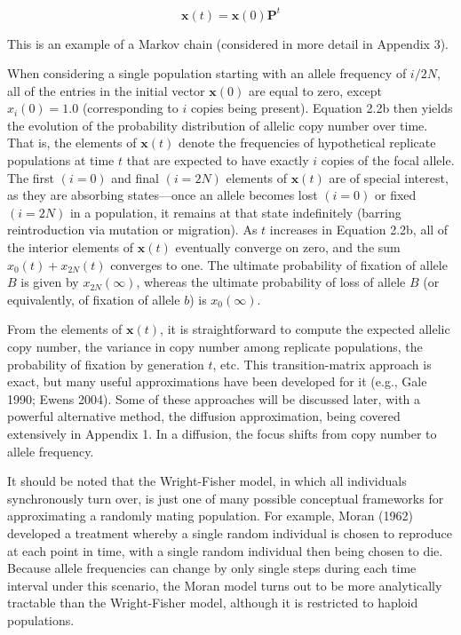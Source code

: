 \documentclass{article}
\begin{document}
\begin{equation}
\mathbf{x}(t)=\mathbf{x}(0)\mathbf{P}^{t}
\tag{2.2b}
\label{eq:2_2b}
\end{equation}

This is an example of a Markov chain (considered in more detail in Appendix 3).

When considering a single population starting with an allele frequency of  $ i/2N $, all of the entries in the initial vector  $ \mathbf{x}(0) $ are equal to zero, except  $ x_i(0) = 1.0 $ (corresponding to  $ i $ copies being present). Equation 2.2b then yields the evolution of the probability distribution of allelic copy number over time. That is, the elements of  $ \mathbf{x}(t) $ denote the frequencies of hypothetical replicate populations at time  $ t $ that are expected to have exactly  $ i $ copies of the focal allele. The first  $ (i = 0) $ and final  $ (i = 2N) $ elements of  $ \mathbf{x}(t) $ are of special interest, as they are absorbing states—once an allele becomes lost  $ (i = 0) $ or fixed  $ (i = 2N) $ in a population, it remains at that state indefinitely (barring reintroduction via mutation or migration). As  $ t $ increases in Equation 2.2b, all of the interior elements of  $ \mathbf{x}(t) $ eventually converge on zero, and the sum  $ x_0(t) + x_{2N}(t) $ converges to one. The ultimate probability of fixation of allele  $ B $ is given by  $ x_{2N}(\infty) $, whereas the ultimate probability of loss of allele  $ B $ (or equivalently, of fixation of allele  $ b $) is  $ x_0(\infty) $.

From the elements of  $ \mathbf{x}(t) $, it is straightforward to compute the expected allelic copy number, the variance in copy number among replicate populations, the probability of fixation by generation  $ t $, etc. This transition-matrix approach is exact, but many useful approximations have been developed for it (e.g., Gale 1990; Ewens 2004). Some of these approaches will be discussed later, with a powerful alternative method, the diffusion approximation, being covered extensively in Appendix 1. In a diffusion, the focus shifts from copy number to allele frequency.

It should be noted that the Wright-Fisher model, in which all individuals synchronously turn over, is just one of many possible conceptual frameworks for approximating a randomly mating population. For example, Moran (1962) developed a treatment whereby a single random individual is chosen to reproduce at each point in time, with a single random individual then being chosen to die. Because allele frequencies can change by only single steps during each time interval under this scenario, the Moran model turns out to be more analytically tractable than the Wright-Fisher model, although it is restricted to haploid populations.
\end{document}

